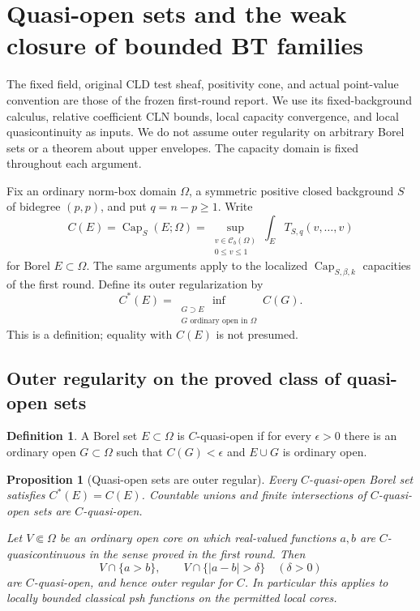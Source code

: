 \documentclass[11pt,a4paper]{article}
\numberwithin{equation}{section}
\newtheorem{proposition}[theorem]{Proposition}
\theoremstyle{definition}
\newtheorem{definition}[theorem]{Definition}
\theoremstyle{remark}
\begin{document}


\section{Quasi-open sets and the weak closure of bounded BT families}
\label{sec:r2-weak-closure}

The fixed field, original CLD test sheaf, positivity cone, and actual
point-value convention are those of the frozen first-round report.
We use its fixed-background calculus, relative coefficient CLN bounds,
local capacity convergence, and local quasicontinuity as inputs. We do
not assume outer regularity on arbitrary Borel sets or a theorem about
upper envelopes. The capacity domain is fixed throughout each argument.

Fix an ordinary norm-box domain $\Omega$, a symmetric positive closed
background $S$ of bidegree $(p,p)$, and put $q=n-p\geq1$. Write
\[
 C(E)=\operatorname{Cap}_S(E;\Omega)
   =\sup_{\substack{v\in\mathcal C_b(\Omega)\\0\leq v\leq1}}
      \int_E T_{S,q}(v,\ldots,v)
\]
for Borel $E\subset\Omega$. The same arguments apply to the localized
$\operatorname{Cap}_{S,\beta,k}$ capacities of the first round.
Define its outer regularization by
\[
 C^*(E)=\inf_{\substack{G\supset E\\G\text{ ordinary open in }\Omega}}
          C(G).
\]
This is a definition; equality with $C(E)$ is not presumed.

\subsection{Outer regularity on the proved class of quasi-open sets}

\begin{definition}
A Borel set $E\subset\Omega$ is $C$-quasi-open if for every
$\epsilon>0$ there is an ordinary open $G\subset\Omega$ such that
$C(G)<\epsilon$ and $E\cup G$ is ordinary open.
\end{definition}

\begin{proposition}[Quasi-open sets are outer regular]
\label{prop:r2-quasiopen-outer}
Every $C$-quasi-open Borel set satisfies $C^*(E)=C(E)$.
Countable unions and finite intersections of $C$-quasi-open sets
are $C$-quasi-open.

Let $V\Subset\Omega$ be an ordinary open core on which real-valued
functions $a,b$ are $C$-quasicontinuous in the sense proved in the
first round. Then
\[
 V\cap\{a>b\},\qquad V\cap\{|a-b|>\delta\}\quad(\delta>0)
\]
are $C$-quasi-open, and hence outer regular for $C$.
In particular this applies to locally bounded classical psh
functions on the permitted local cores.
\end{proposition}
\end{document}
